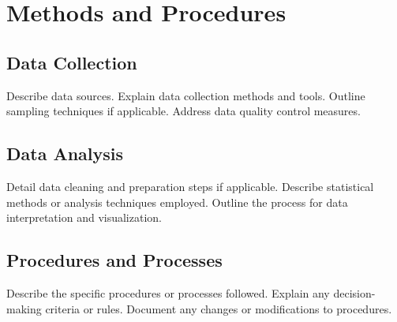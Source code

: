 \section{Methods and Procedures}
\subsection{Data Collection}
Describe data sources.
Explain data collection methods and tools.
Outline sampling techniques if applicable.
Address data quality control measures.

\subsection{Data Analysis}
Detail data cleaning and preparation steps if applicable.
Describe statistical methods or analysis techniques employed.
Outline the process for data interpretation and visualization.

\subsection{Procedures and Processes}
Describe the specific procedures or processes followed.
Explain any decision-making criteria or rules.
Document any changes or modifications to procedures.
